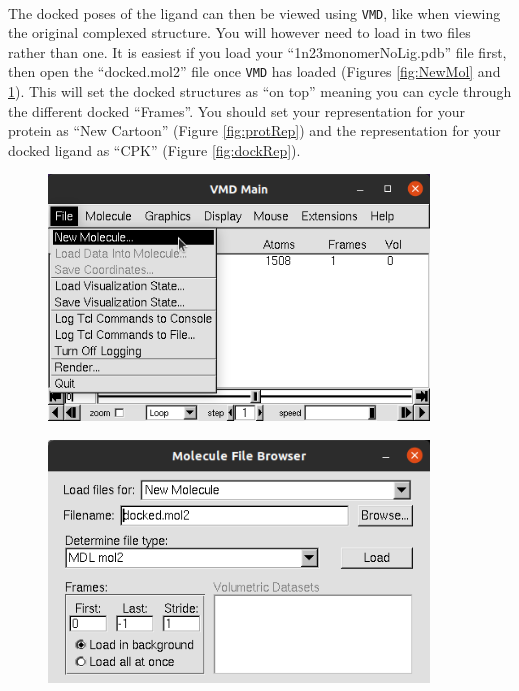     \paragraph{}
    The docked poses of the ligand can then be viewed using \texttt{VMD}, like when viewing the original complexed structure. You will however need to load in two files rather than one. It is easiest if you load your \enquote{1n23\textunderscore monomer\textunderscore NoLig.pdb} file first, then open the \enquote{docked.mol2} file once \texttt{VMD} has loaded (Figures \ref{fig:NewMol} and \ref{fig:LoadMol}). This will set the docked structures as \enquote{on top} meaning you can cycle through the different docked \enquote{Frames}. You should set your representation for your protein as \enquote{New Cartoon} (Figure \ref{fig:protRep}) and the representation for your docked ligand as \enquote{CPK} (Figure \ref{fig:dockRep}). 
        
    \begin{figure}[H]
        \centering
        \begin{minipage}{0.45\textwidth}
            \centering
            \includegraphics[width=0.9\textwidth]{Graphics/ScreenShots/NewMol.png}
            \label{fig:NewMol}
        \end{minipage}%
        \begin{minipage}{0.45\textwidth}
            \centering
            \includegraphics[width=0.9\textwidth]{Graphics/ScreenShots/docked_file.png}
            \label{fig:LoadMol}
        \end{minipage}
    \end{figure}

